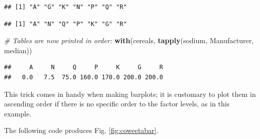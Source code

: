 \documentclass[]{book}
\newenvironment{Shaded}{\begin{snugshade}}{\end{snugshade}}
\newcommand{\CommentTok}[1]{\textcolor[rgb]{0.56,0.35,0.01}{\textit{#1}}}
\newcommand{\DataTypeTok}[1]{\textcolor[rgb]{0.13,0.29,0.53}{#1}}
\newcommand{\KeywordTok}[1]{\textcolor[rgb]{0.13,0.29,0.53}{\textbf{#1}}}
\newcommand{\NormalTok}[1]{#1}
\newcommand{\OperatorTok}[1]{\textcolor[rgb]{0.81,0.36,0.00}{\textbf{#1}}}
\newcommand{\OtherTok}[1]{\textcolor[rgb]{0.56,0.35,0.01}{#1}}
\newcommand{\StringTok}[1]{\textcolor[rgb]{0.31,0.60,0.02}{#1}}
\begin{document}
\begin{verbatim}
## [1] "A" "G" "K" "N" "P" "Q" "R"
\end{verbatim}

\begin{Shaded}
\end{Shaded}

\begin{verbatim}
## [1] "A" "N" "Q" "P" "K" "G" "R"
\end{verbatim}

\begin{Shaded}
\begin{Highlighting}[]
\CommentTok{# Tables are now printed in order:}
\KeywordTok{with}\NormalTok{(cereals, }\KeywordTok{tapply}\NormalTok{(sodium, Manufacturer, median))}
\end{Highlighting}
\end{Shaded}

\begin{verbatim}
##     A     N     Q     P     K     G     R 
##   0.0   7.5  75.0 160.0 170.0 200.0 200.0
\end{verbatim}

This trick comes in handy when making barplots; it is customary to plot them in ascending order if there is no specific order to the factor levels, as in this example.

The following code produces Fig. \ref{fig:coweetabar}.
\end{document}
